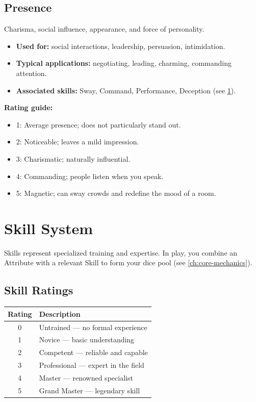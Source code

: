 \subsection{Presence}
\label{sec:attribute-presence}
Charisma, social influence, appearance, and force of personality.
\begin{itemize}
  \item \textbf{Used for:} social interactions, leadership, persuasion, intimidation.
  \item \textbf{Typical applications:} negotiating, leading, charming, commanding attention.
  \item \textbf{Associated skills:} Sway, Command, Performance, Deception (see \ref{sec:skills}).
\end{itemize}
\textbf{Rating guide:}
\begin{itemize}
  \item 1: Average presence; does not particularly stand out.
  \item 2: Noticeable; leaves a mild impression.
  \item 3: Charismatic; naturally influential.
  \item 4: Commanding; people listen when you speak.
  \item 5: Magnetic; can sway crowds and redefine the mood of a room.
\end{itemize}

\newpage
\section{Skill System}
\label{sec:skills}

Skills represent specialized training and expertise. In play, you combine an
Attribute with a relevant Skill to form your dice pool (see \ref{ch:core-mechanics}).

\subsection{Skill Ratings}
\label{sec:skill-ratings}
\begin{center}
\begin{tabular}{cl}
\toprule
\textbf{Rating} & \textbf{Description} \\
\midrule
0 & Untrained --- no formal experience \\
1 & Novice --- basic understanding \\
2 & Competent --- reliable and capable \\
3 & Professional --- expert in the field \\
4 & Master --- renowned specialist \\
5 & Grand Master --- legendary skill \\
\bottomrule
\end{tabular}
\end{center}

